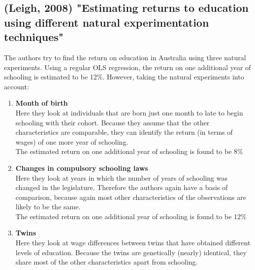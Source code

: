 \documentclass[12pt,a4paper]{article}
\begin{document}
  \subsection{(Leigh, 2008) "Estimating returns to education using different natural experimentation techniques"} %
  \label{sub:leigh}
  The authors try to find the return on education in Australia using three natural experiments. Using a regular
  OLS regression, the return on one additional year of schooling is estimated to be 12\%. However, taking
  the natural experiments into account:
  \begin{enumerate}
    \item \textbf{Month of birth}\\
          Here they look at individuals that are born just one month to late to begin schooling with their cohort.
          Because they assume that the other characteristics are comparable, they can identify the return (in terms of wages)
          of one more year of schooling.\\
          The estimated return on one additional year of schooling is found to be 8\%
    \item \textbf{Changes in compulsory schooling laws}\\
          Here they look at years in which the number of years of schooling was changed in the legislature.
          Therefore the authors again have a basis of comparison, because again most other characteristics of the
          observations are likely to be the same.\\
          The estimated return on one additional year of schooling is found to be 12\%
    \item \textbf{Twins}\\
          Here they look at wage differences between twins that have obtained different levels of education.
          Because the twins are genetically (nearly) identical, they share most of the other characteristics
          apart from schooling.
  \end{enumerate}
\end{document}
